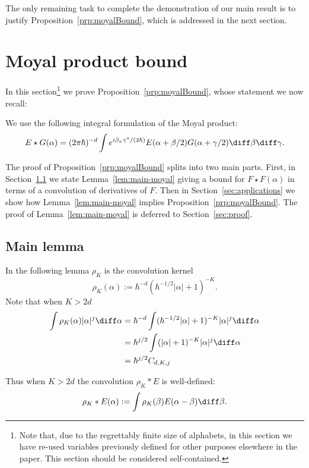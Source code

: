 \documentclass{article}
\numberwithin{equation}{section}
\begin{document}
The only remaining task to complete the demonstration of our main result is to justify Proposition~\ref{prp:moyalBound}, which is addressed in the next section.

\section{Moyal product bound}\label{sec:moyal}

In this section\footnote{Note that, due to the regrettably finite size of alphabets, in this section we have re-used variables previously defined for other purposes elsewhere in the paper. This section should be considered self-contained.} we prove Proposition~\ref{prp:moyalBound}, whose statement we now recall:


\prpMoyalBound*

We use the following integral formulation of the Moyal product:
\begin{equation}
	\label{eq:moyal-def}
	E\star G(\alpha) =
	(2\pi \hbar)^{-d}
	\int e^{i\beta_a\gamma^a/(2\hbar)} E(\alpha+\beta/2)G(\alpha+\gamma/2) \diff\beta\diff\gamma.
\end{equation}

The proof of Proposition~\ref{prp:moyalBound} splits into two main parts.  First, in Section~\ref{sec:main-lemma} we
state Lemma~\ref{lem:main-moyal} giving a bound for $F\star F(\alpha)$ in terms of a convolution of derivatives of $F$.
Then in Section~\ref{sec:applications} we show how Lemma~\ref{lem:main-moyal} implies Proposition~\ref{prp:moyalBound}.
The proof of Lemma~\ref{lem:main-moyal} is deferred to Section~\ref{sec:proof}.

\subsection{Main lemma}
\label{sec:main-lemma}

In the following lemma $\rho_K$ is the convolution kernel
\[
\rho_K(\alpha) := \hbar^{-d} (\hbar^{-1/2}|\alpha| + 1)^{-K}.
\]
Note that when $K>2d$
\begin{align*}
	\int \rho_K(\alpha) |\alpha|^j \diff \alpha
	&= \hbar^{-d} \int (\hbar^{-1/2}|\alpha|+1)^{-K}|\alpha|^j \diff \alpha \\
	&= \hbar^{j/2} \int (|\alpha| + 1)^{-K} |\alpha|^j \diff \alpha\\
	&= \hbar^{j/2} C_{d,K,j}
\end{align*}

Thus when $K>2d$ the convolution $\rho_K\ast E$ is well-defined:
\begin{equation}
	\rho_K\ast E(\alpha) :=
	\int \rho_K(\beta) E(\alpha-\beta)\diff\beta.
\end{equation}
\end{document}
